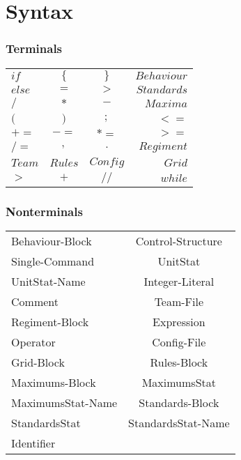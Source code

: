 \section{Syntax}
	\subsubsection{Terminals}
		
		\begin{tabular}{ l c c r}
			$if  	 $& $\{ 	 $&$ \} 	  $&$ Behaviour$  \\
		  	$else	 $&$ = 		 $&$ >  	  $&$ Standards$  \\
		 	$/ 		 $&$ *  	 $&$ -  	  $&$ Maxima$	  \\
		 	$( 		 $&$ )  	 $&$ ;  	  $&$ < =$		  \\
		 	$+= 	 $&$ -=   	 $&$ *= 	  $&$ > =$	    \\
		 	$/= 	 $&$ ,     	 $&$ .  	  $&$ Regiment$   \\
			$Team	 $&$ Rules   $&$ Config   $&$ Grid$	   \\
			$>		 $&$   + 	 $&$ //	 	  $&$ while $   \\
		\end{tabular}
	\subsubsection{Nonterminals}
		\begin{tabular}{l c}
			Behaviour-Block   & Control-Structure   \\
			Single-Command    & UnitStat 			\\
			UnitStat-Name	  & Integer-Literal		\\
			Comment			  & Team-File 			\\
			Regiment-Block	  & Expression			\\
			Operator		  & Config-File			\\
			Grid-Block	      & Rules-Block 		\\
			Maximums-Block	  & MaximumsStat		\\
			MaximumsStat-Name & Standards-Block	 	\\
			StandardsStat	  & StandardsStat-Name 	\\
			Identifier		  & 					\\
		\end{tabular}
	
